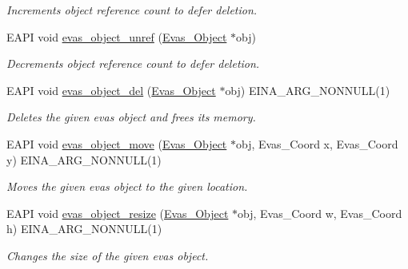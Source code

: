 \begin{DoxyCompactItemize}
\begin{DoxyCompactList}\small\item\em Increments object reference count to defer deletion. \item\end{DoxyCompactList}\item 
EAPI void \hyperlink{group__Evas__Object__Group__Basic_ga956f8793fd2897945d90bda2d4d08089}{evas\_\-object\_\-unref} (\hyperlink{group__Evas__Object__Group_ga9e19e6dd1f517a0ba437c0114d3e7c97}{Evas\_\-Object} $\ast$obj)
\begin{DoxyCompactList}\small\item\em Decrements object reference count to defer deletion. \item\end{DoxyCompactList}\item 
EAPI void \hyperlink{group__Evas__Object__Group__Basic_ga6d840e8d5670db3ae32e00c4ecbb6abd}{evas\_\-object\_\-del} (\hyperlink{group__Evas__Object__Group_ga9e19e6dd1f517a0ba437c0114d3e7c97}{Evas\_\-Object} $\ast$obj) EINA\_\-ARG\_\-NONNULL(1)
\begin{DoxyCompactList}\small\item\em Deletes the given evas object and frees its memory. \item\end{DoxyCompactList}\item 
EAPI void \hyperlink{group__Evas__Object__Group__Basic_ga78fa8858c51707f1a557b720014b71cc}{evas\_\-object\_\-move} (\hyperlink{group__Evas__Object__Group_ga9e19e6dd1f517a0ba437c0114d3e7c97}{Evas\_\-Object} $\ast$obj, Evas\_\-Coord x, Evas\_\-Coord y) EINA\_\-ARG\_\-NONNULL(1)
\begin{DoxyCompactList}\small\item\em Moves the given evas object to the given location. \item\end{DoxyCompactList}\item 
EAPI void \hyperlink{group__Evas__Object__Group__Basic_ga34df8b33704deafd2a25f40e3c09d149}{evas\_\-object\_\-resize} (\hyperlink{group__Evas__Object__Group_ga9e19e6dd1f517a0ba437c0114d3e7c97}{Evas\_\-Object} $\ast$obj, Evas\_\-Coord w, Evas\_\-Coord h) EINA\_\-ARG\_\-NONNULL(1)
\begin{DoxyCompactList}\small\item\em Changes the size of the given evas object. \item\end{DoxyCompactList}\item 

\end{DoxyCompactItemize}

